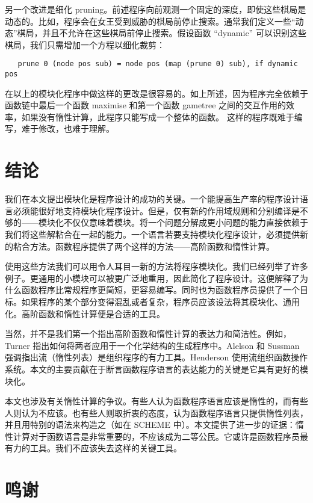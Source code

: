\documentclass[12pt,a4paper]{article}
\begin{document}
另一个改进是细化 pruning。前述程序向前观测一个固定的深度，即使这些棋局是动态的。比如，程序会在女王受到威胁的棋局前停止搜索。通常我们定义一些``动态''棋局，并且不允许在这些棋局前停止搜索。假设函数 ``dynamic'' 可以识别这些棋局，我们只需增加一个方程以细化裁剪：

\begin{verbatim}
   prune 0 (node pos sub) = node pos (map (prune 0) sub), if dynamic pos
\end{verbatim}

在以上的模块化程序中做这样的更改是很容易的。如上所述，因为程序完全依赖于函数链中最后一个函数 maximise 和第一个函数 gametree 之间的交互作用的效率，如果没有惰性计算，此程序只能写成一个整体的函数。 这样的程序既难于编写，难于修改，也难于理解。

\section{结论}

我们在本文提出模块化是程序设计的成功的关键。一个能提高生产率的程序设计语言必须能很好地支持模块化程序设计。但是，仅有新的作用域规则和分别编译是不够的——模块化不仅仅意味着模块。将一个问题分解成更小问题的能力直接依赖于我们将这些解粘合在一起的能力。一个语言若要支持模块化程序设计，必须提供新的粘合方法。函数程序提供了两个这样的方法——高阶函数和惰性计算。

使用这些方法我们可以用令人耳目一新的方法将程序模块化。我们已经列举了许多例子。更通用的小模块可以被更广泛地重用，因此简化了程序设计。这便解释了为什么函数程序比常规程序更简短，更容易编写。同时也为函数程序员提供了一个目标。如果程序的某个部分变得混乱或者复杂，程序员应该设法将其模块化、通用化。高阶函数和惰性计算便是合适的工具。

当然，并不是我们第一个指出高阶函数和惰性计算的表达力和简洁性。例如，Turner 指出如何将两者应用于一个化学结构的生成程序中\cite[Tur81]{Tur81}。Alelson 和 Sussman 强调指出流（惰性列表）是组织程序的有力工具\cite[AS86]{AS86}。Henderson 使用流组织函数操作系统\cite[P.H82]{P.H82}。本文的主要贡献在于断言函数程序语言的表达能力的关键是它具有更好的模块化。

本文也涉及有关惰性计算的争议。有些人认为函数程序语言应该是惰性的，而有些人则认为不应该。也有些人则取折衷的态度，认为函数程序语言只提供惰性列表，并且用特别的语法来构造之（如在 SCHEME\cite[AS86]{AS86} 中）。本文提供了进一步的证据：惰性计算对于函数语言是非常重要的，不应该成为二等公民。它或许是函数程序员最有力的工具。我们不应该失去这样的关键工具。

\section{鸣谢}
\end{document}
